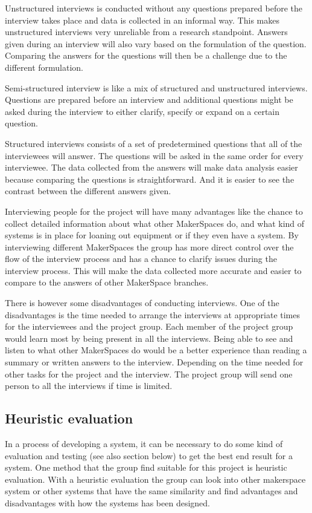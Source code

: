 Unstructured interviews is conducted without any questions prepared before the interview takes place and data is collected in an informal way. This makes unstructured interviews very unreliable from a research standpoint. Answers given during an interview will also vary based on the formulation of the question. Comparing the answers for the questions will then be a challenge due to the different formulation.

Semi-structured interview is like a mix of structured and unstructured interviews. Questions are prepared before an interview and additional questions might be asked during the interview to either clarify, specify or expand on a certain question. 

Structured interviews consists of a set of predetermined questions that all of the interviewees will answer. The questions will be asked in the same order for every interviewee. The data collected from the answers will make data analysis easier because comparing the questions is straightforward. And it is easier to see the contrast between the different answers given.

Interviewing people for the project will have many advantages like the chance to collect detailed information about what other MakerSpaces do, and what kind of systems is in place for loaning out equipment or if they even have a system. By interviewing different MakerSpaces the group has more direct control over the flow of the interview process and has a chance to clarify issues during the interview process. This will make the data collected more accurate and easier to compare to the answers of other MakerSpace branches.

There is however some disadvantages of conducting interviews. One of the disadvantages is the time needed to arrange the interviews at appropriate times for the interviewees and the project group. Each member of the project group would learn most by being present in all the interviews. Being able to see and listen to what other MakerSpaces do would be a better experience than reading a summary or written answers to the interview. Depending on the time needed for other tasks for the project and the interview. The project group will send one person to all the interviews if time is limited.
 
\subsection{Heuristic evaluation}
In a process of developing a system, it can be necessary to do some kind of evaluation and testing\cite{heuristic-evaluation} (see also section below) to get the best end result for a system. One method that the group find suitable for this project is heuristic evaluation. With a heuristic evaluation the group can look into other makerspace system or other systems that have the same similarity and find advantages and disadvantages with how the systems has been designed.

